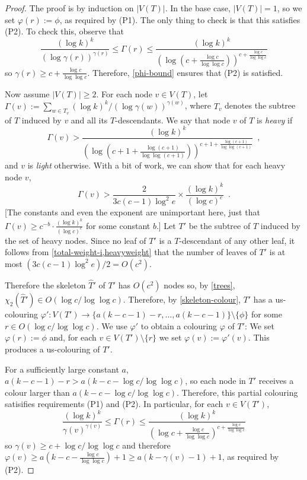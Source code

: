 \documentclass[kpfonts]{patmorin}
\newcommand{\uqs}{\chi_2}
\begin{document}
\begin{proof}
    The proof is by induction on $|V(T)|$.  In the base case, $|V(T)|=1$, so we set $\varphi(r):=\phi$, as required by (P1). The only thing to check is that this satisfies (P2). To check this, observe that
    \[ \frac{(\log k)^k}{(\log\gamma(r))^{\gamma(r)}}\le \Gamma(r) \le \frac{(\log k)^k}{\left(\log \left(c+\tfrac{\log c}{\log\log c}\right)\right)^{c+\tfrac{\log c}{\log\log c}}}
    \]
    so $\gamma(r) \ge c+\tfrac{\log c}{\log\log c}$. Therefore, \cref{phi-bound} ensures that (P2) is satisfied.

    Now assume $|V(T)|\ge 2$.  For each node $v\in V(T)$, let $\Gamma(v):=\sum_{w\in T_v} (\log k)^k/(\log\gamma(w))^{\gamma(w)}$, where $T_v$ denotes the subtree of $T$ induced by $v$ and all its $T$-descendants.  We say that node $v$ of $T$ is \emph{heavy} if
    \[
        \Gamma(v)> \frac{(\log k)^k}{\left(\log\left(c+1+\tfrac{\log (c+1)}{\log\log (c+1)}\right)\right)^{c+1+\tfrac{\log (c+1)}{\log\log(c+1)}}} \enspace ,
    \]
    and $v$ is \emph{light} otherwise.
    With a bit of work, we can show that for each heavy node $v$,
    \begin{equation}
        \Gamma(v) > \frac{2}{3c(c-1)\log^2 e}\times \frac{(\log k)^k}{(\log c)^c}  \enspace . \label{heavyweight}
    \end{equation}
    [The constants and even the exponent are unimportant here, just that $\Gamma(v) \ge c^{-b}\cdot \frac{(\log k)^k}{(\log c)^c}$ for some constant $b$.]
    Let $T'$ be the subtree of $T$ induced by the set of heavy nodes.  Since no leaf of $T'$ is a $T$-descendant of any other leaf, it follows from \cref{total-weight-i,heavyweight} that the number of leaves of $T'$ is at most $(3c(c-1)\log^2 e)/2= O(c^2)$.

    Therefore the skeleton $\hat{T}'$ of $T'$ has $O(c^2)$ nodes so, by \cref{trees}, $\uqs(\hat{T}')\in O(\log c/\log\log c)$. Therefore, by \cref{skeleton-colour}, $T'$ has a us-colouring $\varphi':V(T')\to \{a(k-c-1)-r,\ldots,a(k-c-1)\}\setminus\{\phi\}$ for some $r\in O(\log c/\log\log c)$.  We use $\varphi'$ to obtain a colouring $\varphi$ of $T'$:  We set $\varphi(r):=\phi$ and, for each $v\in V(T')\setminus\{r\}$ we set $\varphi(v):=\varphi'(v)$.  This produces a us-colouring of $T'$.

    For a sufficiently large constant $a$, $a(k-c-1)-r > a(k-c-\log c/\log\log c)$, so each node in $T'$ receives a colour larger than $a(k-c-\log c/\log\log c)$.  Therefore, this partial colouring satisifies requirements (P1) and (P2). In particular, for each $v\in V(T')$,
    \[
       \frac{(\log k)^k}{\gamma(v)^{\gamma(v)}} \le \Gamma(r) \le \frac{(\log k)^k}{\left(\log c+\tfrac{\log c}{\log\log c}\right)^{c+\tfrac{\log c}{\log\log c}}}
   \]
   so $\gamma(v) \ge c+\log c/\log\log c$ and therefore $\varphi(v) \ge a(k-c-\tfrac{\log c}{\log\log c})+1 \ge a(k-\gamma(v)-1)+1$, as required by (P2).


\end{proof}
\end{document}
